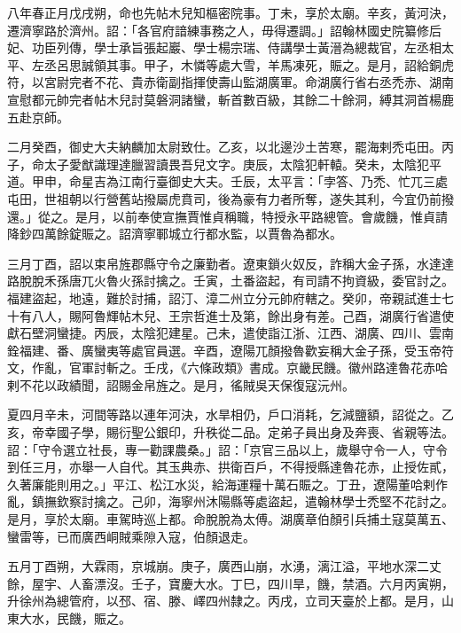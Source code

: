 \begin{pinyinscope}
 八年春正月戊戌朔，命也先帖木兒知樞密院事。丁未，享於太廟。辛亥，黃河決，遷濟寧路於濟州。詔：「各官府諳練事務之人，毋得遷調。」詔翰林國史院纂修后妃、功臣列傳，學士承旨張起巖、學士楊宗瑞、侍講學士黃溍為總裁官，左丞相太平、左丞呂思誠領其事。甲子，木憐等處大雪，羊馬凍死，賑之。是月，詔給銅虎符，以宮尉完者不花、貴赤衛副指揮使壽山監湖廣軍。命湖廣行省右丞禿赤、湖南宣慰都元帥完者帖木兒討莫磐洞諸蠻，斬首數百級，其餘二十餘洞，縛其洞首楊鹿五赴京師。



 二月癸酉，御史大夫納麟加太尉致仕。乙亥，以北邊沙土苦寒，罷海剌禿屯田。丙子，命太子愛猷識理達臘習讀畏吾兒文字。庚辰，太陰犯軒轅。癸未，太陰犯平道。甲申，命星吉為江南行臺御史大夫。壬辰，太平言：「孛答、乃禿、忙兀三處屯田，世祖朝以行營舊站撥屬虎賁司，後為豪有力者所奪，遂失其利，今宜仍前撥還。」從之。是月，以前奉使宣撫賈惟貞稱職，特授永平路總管。會歲饑，惟貞請降鈔四萬餘錠賑之。詔濟寧鄆城立行都水監，以賈魯為都水。



 三月丁酉，詔以束帛旌郡縣守令之廉勤者。遼東鎖火奴反，詐稱大金子孫，水達達路脫脫禾孫唐兀火魯火孫討擒之。壬寅，土番盜起，有司請不拘資級，委官討之。福建盜起，地遠，難於討捕，詔汀、漳二州立分元帥府轄之。癸卯，帝親試進士七十有八人，賜阿魯輝帖木兒、王宗哲進士及第，餘出身有差。己酉，湖廣行省遣使獻石壁洞蠻捷。丙辰，太陰犯建星。己未，遣使詣江浙、江西、湖廣、四川、雲南銓福建、番、廣蠻夷等處官員選。辛酉，遼陽兀顏撥魯歡妄稱大金子孫，受玉帝符文，作亂，官軍討斬之。壬戌，《六條政類》書成。京畿民饑。徽州路達魯花赤哈剌不花以政績聞，詔賜金帛旌之。是月，徭賊吳天保復寇沅州。



 夏四月辛未，河間等路以連年河決，水旱相仍，戶口消耗，乞減鹽額，詔從之。乙亥，帝幸國子學，賜衍聖公銀印，升秩從二品。定弟子員出身及奔喪、省親等法。詔：「守令選立社長，專一勸課農桑。」詔：「京官三品以上，歲舉守令一人，守令到任三月，亦舉一人自代。其玉典赤、拱衛百戶，不得授縣達魯花赤，止授佐貳，久著廉能則用之。」平江、松江水災，給海運糧十萬石賑之。丁丑，遼陽董哈剌作亂，鎮撫欽察討擒之。己卯，海寧州沐陽縣等處盜起，遣翰林學士禿堅不花討之。是月，享於太廟。車駕時巡上都。命脫脫為太傅。湖廣章伯顏引兵捕土寇莫萬五、蠻雷等，已而廣西峒賊乘隙入寇，伯顏退走。



 五月丁酉朔，大霖雨，京城崩。庚子，廣西山崩，水湧，漓江溢，平地水深二丈餘，屋宇、人畜漂沒。壬子，寶慶大水。丁巳，四川旱，饑，禁酒。六月丙寅朔，升徐州為總管府，以邳、宿、滕、嶧四州隸之。丙戌，立司天臺於上都。是月，山東大水，民饑，賑之。




\end{pinyinscope}
